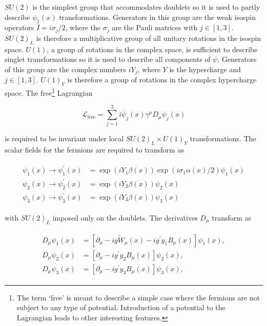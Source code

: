 $SU(2)$ is the simplest group that accommodates doublets so it is used to partly describe $\psi_1(x)$ transformations. 
Generators in this group are the weak isospin operators $\hat{I} = i\sigma_j/2$, where 
the $\sigma_j$ are the Pauli matrices with $j\in[1,3]$. $SU(2)_L$ is therefore a multiplicative group of all 
unitary rotations in the isospin space.  $U(1)$, a group of rotations in the complex space, 
 is sufficient to describe singlet transformations so it is used to describe all components of $\psi$. 
Generators of this group are the complex numbers $iY_j$, where $Y$ is the hypercharge and $j\in[1,3]$.
$U(1)_Y$ is therefore a group of rotations in the complex hypercharge space.  
The free\footnote{The term `free' is meant to describe a simple case where the fermions are not subject 
to any type of potential. Introduction of a potential to the Lagrangian leads to other interesting 
features.} Lagrangian 

\begin{equation}
\mathcal{L}_{\text{free}} = \sum_{j=1}^{3} i\overline{\psi}_j(x)\gamma^\mu D_\mu\psi_j(x) 
\label{eq:freeG}
\end{equation}

is required to be invariant under local $SU(2)_L\times U(1)_Y$ transformations. 
 The scalar fields for the 
fermions are required to transform as 

\begin{align}
\begin{split}
\psi_1(x) \rightarrow \psi^{'}_1(x) &= \exp(iY_1\beta(x))\exp(i\sigma_1\alpha(x)/2)\psi_1(x) \\
\psi_2(x) \rightarrow \psi^{'}_2(x) &= \exp(iY_2\beta(x))\psi_2(x) \\
\psi_3(x) \rightarrow \psi^{'}_3(x) &= \exp(iY_3\beta(x))\psi_3(x)
\end{split}
\end{align}

with $SU(2)_L$ imposed only on the doublets. The derivatives $D_\mu$ transform as  

\begin{align}
\begin{split}
D_\mu\psi_1(x) &= [\partial_\mu - ig\widetilde{W}_\mu(x) - ig^{'}y_1B_\mu(x)]\psi_1(x), \\
D_\mu\psi_2(x) &= [\partial_\mu - ig^{'}y_2B_\mu(x)]\psi_2(x), \\
D_\mu\psi_3(x) &= [\partial_\mu - ig^{'}y_3B_\mu(x)]\psi_3(x), 
\end{split}
\end{align}


